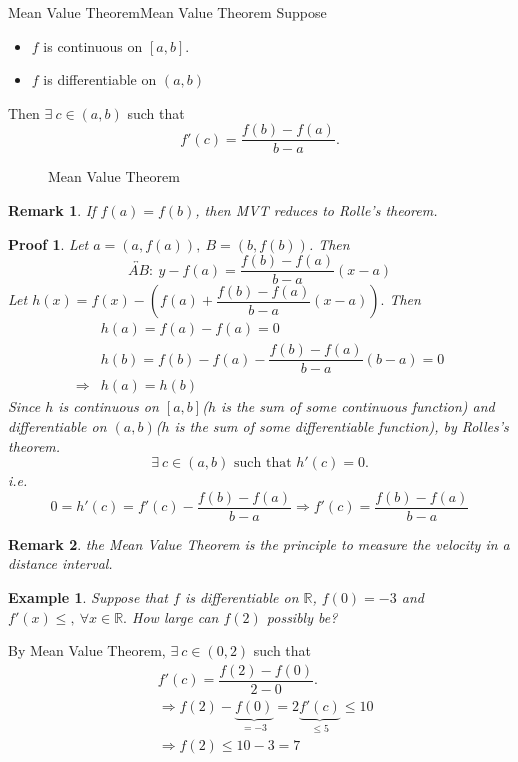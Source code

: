 \documentclass[12pt,a4paper]{article}
\newcommand{\R}{\mathbb{R}}
\theoremstyle{mystyle}
\numberwithin{figure}{subsection}
\newtheorem{exm}{Example}[subsection] %
\newtheorem{rem}{Remark}[subsection] %
\newtheorem{pf}{Proof}[subsection]
\newenvironment{ex}{\begin{exBox}\begin{exm}}{\end{exm}\end{exBox}}
\begin{document}
\begin{thm}{Mean Value Theorem}{Mean Value Theorem}
Suppose
    \begin{itemize}
        \item[(1)] $f$ is continuous on $[a,b]$.
        \item[(2)] $f$ is differentiable on $(a,b)$
    \end{itemize}
Then $\exists \ c \in (a,b)$ such that
\[
f'(c) = \dfrac{f(b)-f(a)}{b-a}.
\]
\end{thm}
\begin{figure}[h]
    \centering
    
    \caption{Mean Value Theorem}
    \label{MVT}
\end{figure}
\begin{rem}
If $f(a)=f(b)$, then MVT reduces to Rolle's theorem.
\end{rem}
\begin{pf}
    Let $a=(a,f(a)), \ B = (b,f(b))$. Then
\[
\overleftrightarrow{AB}: \ y-f(a)=\dfrac{f(b)-f(a)}{b-a}(x-a)
\]
Let $h(x)=f(x)-\left(f(a)+\dfrac{f(b)-f(a)}{b-a}(x-a)\right).$ Then
\begin{align*}
&h(a)=f(a)-f(a)=0 \\
&h(b)=f(b)-f(a)-\dfrac{f(b)-f(a)}{b-a}(b-a)=0 \\
\Rightarrow &h(a)=h(b)
\end{align*}
Since $h$ is continuous on $[a,b]$($h$ is the sum of some continuous function) and differentiable on $(a,b)$($h$ is the sum of some differentiable function), by Rolles's theorem.
\[
\exists  \ c \in (a,b) \text{ such that } h'(c)=0.
\]
i.e.
\[
0 = h'(c)=f'(c)-\dfrac{f(b)-f(a)}{b-a} \Longrightarrow f'(c)= \dfrac{f(b)-f(a)}{b-a}
\]
\end{pf}
\begin{rem}
the Mean Value Theorem is the principle to measure the velocity in a distance interval.
\end{rem}
\begin{ex}
    Suppose that $f$ is differentiable on $\R$, $f(0)=-3$ and $f'(x) \le , \ \forall x \in \R.$ How large can $f(2)$ possibly be?
\end{ex}
By Mean Value Theorem, $\exists \ c \in (0,2)$ such that
\begin{align*}
&f'(c) = \dfrac{f(2)-f(0)}{2-0}. \\
&\Rightarrow f(2)-\underbrace{f(0)}_{=-3} = 2\underbrace{f'(c)}_{\le 5} \le 10 \\
&\Rightarrow f(2) \le 10 -3 = 7
\end{align*}
\end{document}
